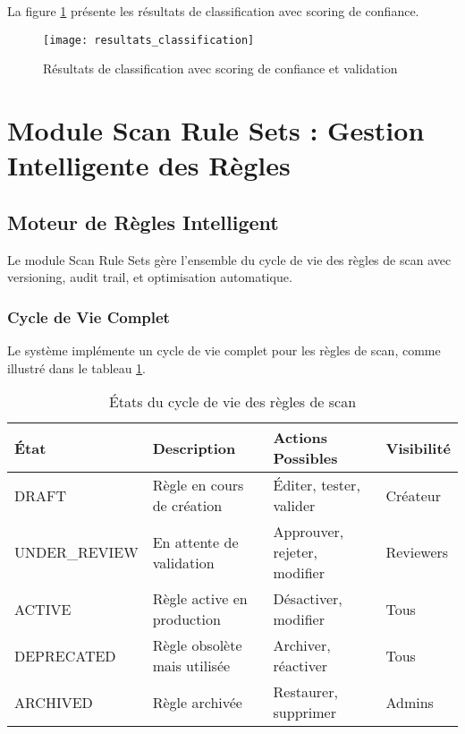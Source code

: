 La figure \ref{fig:resultats_classification} présente les résultats de classification avec scoring de confiance.

\begin{figure}[htpb]
\centering
\texttt{[image: resultats\_classification]}
\caption{Résultats de classification avec scoring de confiance et validation}
\label{fig:resultats_classification}
\end{figure}

\section{Module Scan Rule Sets : Gestion Intelligente des Règles}

\subsection{Moteur de Règles Intelligent}

Le module Scan Rule Sets gère l'ensemble du cycle de vie des règles de scan avec versioning, audit trail, et optimisation automatique.

\subsubsection{Cycle de Vie Complet}

Le système implémente un cycle de vie complet pour les règles de scan, comme illustré dans le tableau \ref{tab:cycle_vie_regles}.

\begin{table}[htpb]
\centering
\caption{États du cycle de vie des règles de scan}
\label{tab:cycle_vie_regles}
\begin{tabular}{|p{}|p{}|p{}|p{}|}
\hline
\textbf{État} & \textbf{Description} & \textbf{Actions Possibles} & \textbf{Visibilité} \\
\hline
DRAFT & Règle en cours de création & Éditer, tester, valider & Créateur \\
\hline
UNDER\_REVIEW & En attente de validation & Approuver, rejeter, modifier & Reviewers \\
\hline
ACTIVE & Règle active en production & Désactiver, modifier & Tous \\
\hline
DEPRECATED & Règle obsolète mais utilisée & Archiver, réactiver & Tous \\
\hline
ARCHIVED & Règle archivée & Restaurer, supprimer & Admins \\
\hline
\end{tabular}
\end{table}

